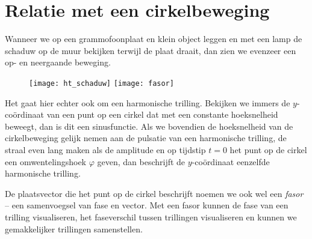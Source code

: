 \documentclass{ximera}
\begin{document}
	\author{Bart Lambregs}
    \xmsource



	\section{Relatie met een cirkelbeweging}

	Wanneer we op een grammofoonplaat en klein object leggen en met een lamp de schaduw op de muur bekijken terwijl de plaat draait, dan zien we evenzeer een op- en neergaande beweging. 
	\begin{figure}[h]
	\texttt{[image: ht\_schaduw]}
	\hspace{5mm}
	\texttt{[image: fasor]}
	\end{figure}
	Het gaat hier echter ook om een harmonische trilling. Bekijken we immers de $y$-co\"ordinaat van een punt op een cirkel dat met een constante hoeksnelheid beweegt, dan is dit een sinusfunctie. Als we bovendien de hoeksnelheid van de cirkelbeweging gelijk nemen aan de pulsatie van een harmonische trilling, de straal even lang maken als de amplitude en op tijdstip $t=0$ het punt op de cirkel een omwentelingshoek $\varphi$ geven, dan beschrijft de $y$-co\"ordinaat eenzelfde harmonische trilling. 
	
	De plaatsvector die het punt op de cirkel beschrijft noemen we ook wel een \emph{fasor} -- een samenvoegsel van fase en vector. Met een fasor kunnen de fase van een trilling visualiseren, het faseverschil tussen trillingen visualiseren en kunnen we gemakkelijker trillingen samenstellen. 
	
	
\end{document}

